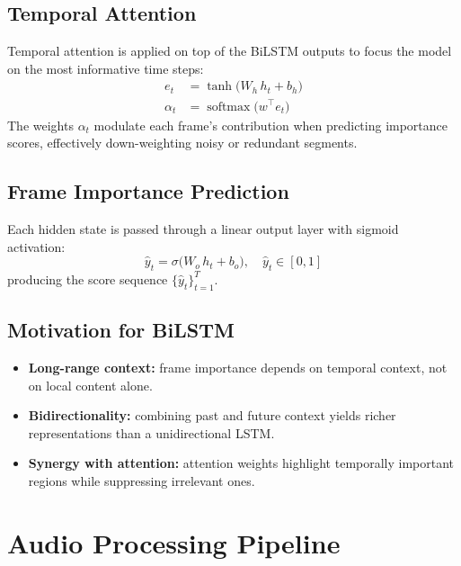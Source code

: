 \documentclass[12pt, a4paper]{report}
\begin{document}
\section{Temporal Attention}

Temporal attention is applied on top of the BiLSTM outputs to focus the model on
the most informative time steps:
\begin{align}
  e_t      &= \tanh\!\bigl(W_h\, h_t + b_h\bigr) \\
  \alpha_t &= \operatorname{softmax}\!\bigl(w^{\top} e_t\bigr)
\end{align}
The weights $\alpha_t$ modulate each frame's contribution when predicting importance
scores, effectively down-weighting noisy or redundant segments.

\section{Frame Importance Prediction}

Each hidden state is passed through a linear output layer with sigmoid activation:
\begin{equation}
  \hat{y}_t = \sigma\!\bigl(W_o\, h_t + b_o\bigr), \quad \hat{y}_t \in [0,1]
\end{equation}
producing the score sequence $\{\hat{y}_t\}_{t=1}^{T}$.

\section{Motivation for BiLSTM}

\begin{itemize}
  \item \textbf{Long-range context:} frame importance depends on temporal context,
        not on local content alone.
  \item \textbf{Bidirectionality:} combining past and future context yields richer
        representations than a unidirectional LSTM.
  \item \textbf{Synergy with attention:} attention weights highlight temporally
        important regions while suppressing irrelevant ones.
\end{itemize}

\chapter{Audio Processing Pipeline}
\end{document}
